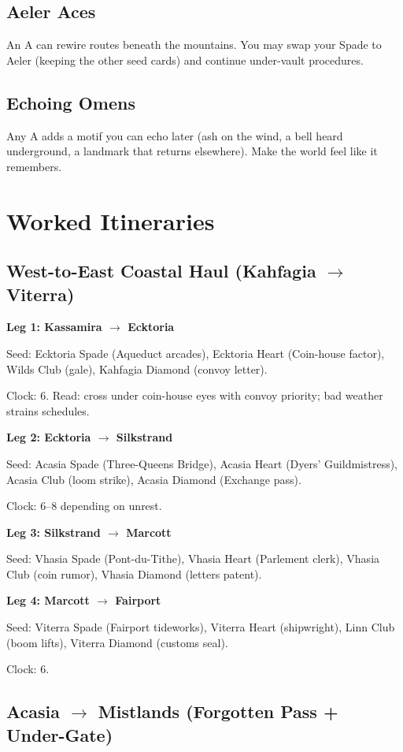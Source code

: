 \subsection{Aeler Aces}
An A can rewire routes beneath the mountains. You may swap your Spade to Aeler (keeping the other seed cards) and continue under-vault procedures.

\subsection{Echoing Omens}
Any A adds a motif you can echo later (ash on the wind, a bell heard underground, a landmark that returns elsewhere). Make the world feel like it remembers.

\section{Worked Itineraries}

\subsection{West-to-East Coastal Haul (Kahfagia $\rightarrow$ Viterra)}

\textbf{Leg 1: Kassamira $\rightarrow$ Ecktoria}

Seed: Ecktoria Spade (Aqueduct arcades), Ecktoria Heart (Coin-house factor), Wilds Club (gale), Kahfagia Diamond (convoy letter).

Clock: 6. Read: cross under coin-house eyes with convoy priority; bad weather strains schedules.

\textbf{Leg 2: Ecktoria $\rightarrow$ Silkstrand}

Seed: Acasia Spade (Three-Queens Bridge), Acasia Heart (Dyers' Guildmistress), Acasia Club (loom strike), Acasia Diamond (Exchange pass).

Clock: 6--8 depending on unrest.

\textbf{Leg 3: Silkstrand $\rightarrow$ Marcott}

Seed: Vhasia Spade (Pont-du-Tithe), Vhasia Heart (Parlement clerk), Vhasia Club (coin rumor), Vhasia Diamond (letters patent).

\textbf{Leg 4: Marcott $\rightarrow$ Fairport}

Seed: Viterra Spade (Fairport tideworks), Viterra Heart (shipwright), Linn Club (boom lifts), Viterra Diamond (customs seal).

Clock: 6.

\subsection{Acasia $\rightarrow$ Mistlands (Forgotten Pass + Under-Gate)}


